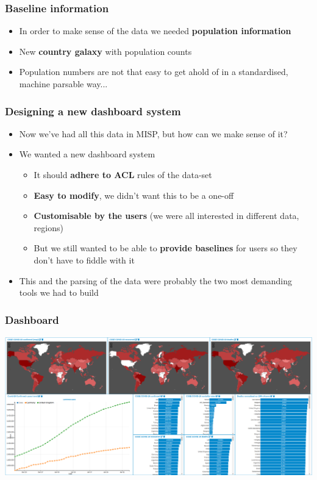 \begin{frame}
    \frametitle{Baseline information}
 \begin{itemize}
         \item In order to make sense of the data we needed {\bf population information}
         \item New {\bf country galaxy} with population counts
         \item Population numbers are not that easy to get ahold of in a standardised, machine parsable way...
 \end{itemize}
\end{frame}

\begin{frame}
    \frametitle{Designing a new dashboard system}
 \begin{itemize}
         \item Now we've had all this data in MISP, but how can we make sense of it?
         \item We wanted a new dashboard system
         \begin{itemize}
              \item It should {\bf adhere to ACL} rules of the data-set
              \item {\bf Easy to modify}, we didn't want this to be a one-off
              \item {\bf Customisable by the users} (we were all interested in different data, regions)
              \item But we still wanted to be able to {\bf provide baselines} for users so they don't have to fiddle with it
         \end{itemize}
         \item This and the parsing of the data were probably the two most demanding tools we had to build
 \end{itemize}
\end{frame}

\begin{frame}
    \frametitle{Dashboard}
    \includegraphics[width=1.00\linewidth]{covid-dashboard.png}
\end{frame}

